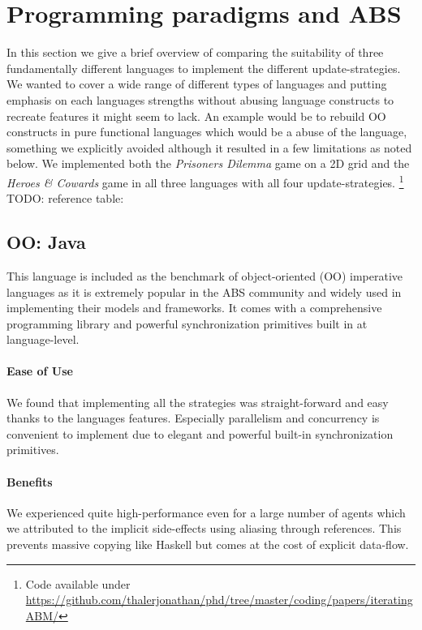 \section{Programming paradigms and ABS}
In this section we give a brief overview of comparing the suitability of three fundamentally different languages to implement the different update-strategies. We wanted to cover a wide range of different types of languages and putting emphasis on each languages strengths without abusing language constructs to recreate features it might seem to lack. An example would be to rebuild OO constructs in pure functional languages which would be a abuse of the language, something we explicitly avoided although it resulted in a few limitations as noted below. We implemented both the \textit{Prisoners Dilemma} game on a 2D grid and the \textit{Heroes \& Cowards} game in all three languages with all four update-strategies. \footnote{Code available under\\ \url{https://github.com/thalerjonathan/phd/tree/master/coding/papers/iteratingABM/}}
TODO: reference table:

\subsection{OO: Java}
This language is included as the benchmark of object-oriented (OO) imperative languages as it is extremely popular in the ABS community and widely used in implementing their models and frameworks. It comes with a comprehensive programming library and powerful synchronization primitives built in at language-level.

\paragraph{Ease of Use}
We found that implementing all the strategies was straight-forward and easy thanks to the languages features. Especially parallelism and concurrency is convenient to implement due to elegant and powerful built-in synchronization primitives.

\paragraph{Benefits}
We experienced quite high-performance even for a large number of agents which we attributed to the implicit side-effects using aliasing through references. This prevents massive copying like Haskell but comes at the cost of explicit data-flow.

